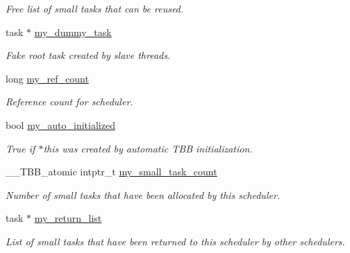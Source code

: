 \begin{DoxyCompactItemize}
\begin{DoxyCompactList}\small\item\em Free list of small tasks that can be reused. \end{DoxyCompactList}\item 
task $\ast$ \hyperlink{classtbb_1_1internal_1_1generic__scheduler_abc495d5b077a2ef1b05e15e820555d90}{my\+\_\+dummy\+\_\+task}
\begin{DoxyCompactList}\small\item\em Fake root task created by slave threads. \end{DoxyCompactList}\item 
long \hyperlink{classtbb_1_1internal_1_1generic__scheduler_a8cf8d776a439320e1e001381cf5d4ad7}{my\+\_\+ref\+\_\+count}
\begin{DoxyCompactList}\small\item\em Reference count for scheduler. \end{DoxyCompactList}\item 
\hypertarget{classtbb_1_1internal_1_1generic__scheduler_afb5b021643394b6d3f743bea9cb5e2bd}{}bool \hyperlink{classtbb_1_1internal_1_1generic__scheduler_afb5b021643394b6d3f743bea9cb5e2bd}{my\+\_\+auto\+\_\+initialized}\label{classtbb_1_1internal_1_1generic__scheduler_afb5b021643394b6d3f743bea9cb5e2bd}

\begin{DoxyCompactList}\small\item\em True if $\ast$this was created by automatic T\+B\+B initialization. \end{DoxyCompactList}\item 
\hypertarget{classtbb_1_1internal_1_1generic__scheduler_a4bd421a07fae7a1c9e3fa49e005bb513}{}\+\_\+\+\_\+\+T\+B\+B\+\_\+atomic intptr\+\_\+t \hyperlink{classtbb_1_1internal_1_1generic__scheduler_a4bd421a07fae7a1c9e3fa49e005bb513}{my\+\_\+small\+\_\+task\+\_\+count}\label{classtbb_1_1internal_1_1generic__scheduler_a4bd421a07fae7a1c9e3fa49e005bb513}

\begin{DoxyCompactList}\small\item\em Number of small tasks that have been allocated by this scheduler. \end{DoxyCompactList}\item 
\hypertarget{classtbb_1_1internal_1_1generic__scheduler_ab5777a002f8b7b3a72cb7fc4a477fb29}{}task $\ast$ \hyperlink{classtbb_1_1internal_1_1generic__scheduler_ab5777a002f8b7b3a72cb7fc4a477fb29}{my\+\_\+return\+\_\+list}\label{classtbb_1_1internal_1_1generic__scheduler_ab5777a002f8b7b3a72cb7fc4a477fb29}

\begin{DoxyCompactList}\small\item\em List of small tasks that have been returned to this scheduler by other schedulers. \end{DoxyCompactList}\end{DoxyCompactItemize}
